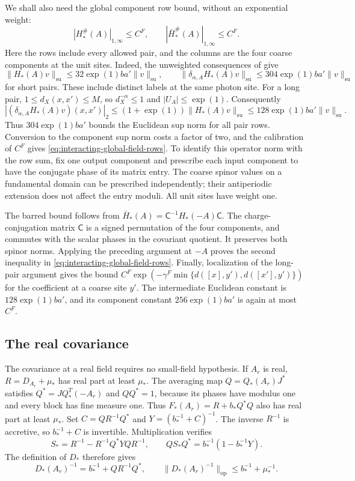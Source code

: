 We shall also need the global component row
bound, without an exponential weight:
\begin{equation}\label{eq:interacting-global-field-rows}
 |H_*^\#(A)|_{1,\infty}\le C^F,\qquad
 |\bar H_*^\#(A)|_{1,\infty}\le C^F .
\end{equation}
Here the rows include every allowed pair, and
the columns are the four coarse components
at the unit sites. Indeed, the unweighted
consequences of \cite[(43)]{FermionBlock}
give
\[
 \|H_*(A)v\|_{\mathrm{su}}
       \le32\exp(1)ba'\|v\|_{\mathrm{su}},\qquad
 \|\delta_{\alpha,A}H_*(A)v\|_{\mathrm{su}}
       \le304\exp(1)ba'\|v\|_{\mathrm{su}}
\]
for short pairs. These include distinct
labels at the same photon site.
For a long pair, $1\le d_X(x,x')\le M$,
so $d_X^{-\alpha}\le1$ and $|U_A|\le\exp(1)$.
Consequently
\[
 |(\delta_{\alpha,A}H_*(A)v)(x,x')|_2
 \le(1+\exp(1))\|H_*(A)v\|_{\mathrm{su}}
 \le128\exp(1)ba'\|v\|_{\mathrm{su}} .
\]
Thus $304\exp(1)ba'$ bounds the Euclidean
sup norm for all pair rows. Conversion to
the component sup norm costs a factor of
two, and the calibration of $C^F$ gives
\eqref{eq:interacting-global-field-rows}.
To identify this operator norm with the row
sum, fix one output component and prescribe
each input component to have the conjugate
phase of its matrix entry. The coarse
spinor values on a fundamental domain can
be prescribed independently; their
antiperiodic extension does not affect
the entry moduli. All unit sites have
weight one.

The barred bound follows from
$\bar H_*(A)=\mathsf C^{-1}H_*(-A)\mathsf C$.
The charge-conjugation matrix $\mathsf C$
is a signed permutation of the four
components, and commutes with the scalar
phases in the covariant quotient. It
preserves both spinor norms. Applying
the preceding argument at $-A$ proves
the second inequality in
\eqref{eq:interacting-global-field-rows}.
Finally, localization of the long-pair
argument gives the bound
$C^F\exp(-\gamma^F\min\{d([x],y'),d([x'],y')\})$
for the coefficient at a coarse site $y'$.
The intermediate Euclidean constant is
$128\exp(1)ba'$, and its component constant
$256\exp(1)ba'$ is again at most $C^F$.

\subsection{The real covariance}
\label{subsec:interacting-covariance}

The covariance at a real field requires no
small-field hypothesis. If $A_r$ is real,
$R=D_{A_r}+\mu_*$ has real part at least $\mu_*$.
The averaging map $Q=Q_*(A_r)J^*$ satisfies
$Q^*=JQ_*^T(-A_r)$ and $QQ^*=1$, because its
phases have modulus one and every block has
fine measure one. Thus $F_*(A_r)=R+b_*Q^*Q$
also has real part at least $\mu_*$.
Set $C=QR^{-1}Q^*$ and $Y=(b_*^{-1}+C)^{-1}$.
The inverse $R^{-1}$ is accretive, so
$b_*^{-1}+C$ is invertible. Multiplication
verifies
\[
 S_*=R^{-1}-R^{-1}Q^*YQR^{-1},\qquad
 Q S_*Q^*=b_*^{-1}(1-b_*^{-1}Y).
\]
The definition of $D_*$ therefore gives
\begin{equation}\label{eq:interacting-coarse-covariance}
 D_*(A_r)^{-1}=b_*^{-1}+QR^{-1}Q^*,\qquad
 \|D_*(A_r)^{-1}\|_{\mathrm{op}}\le b_*^{-1}+\mu_*^{-1}.
\end{equation}

